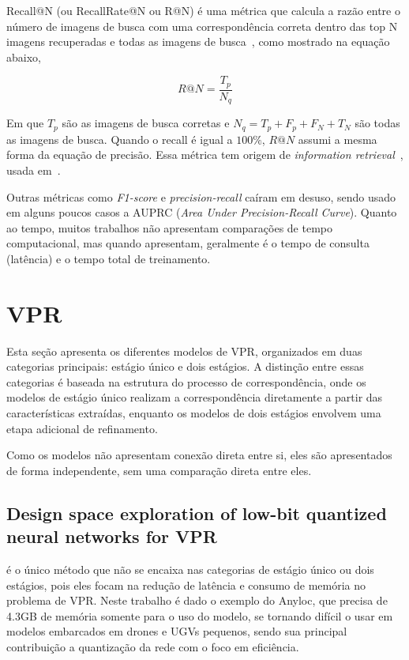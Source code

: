 \documentclass[letterpaper, 10 pt, conference]{ieeeconf}  %
\begin{document}
Recall@N (ou RecallRate@N ou R@N) é uma métrica que calcula a razão entre o número de imagens de busca com uma correspondência correta dentro das top N imagens recuperadas e todas as imagens de busca~\cite{vpr_bench, selavpr, ir1}, como mostrado na equação abaixo,

$$
R@N = \frac{T_p}{N_q}
$$

Em que $T_p$ são as imagens de busca corretas e $N_q = T_p + F_p + F_N + T_N$ são todas as imagens de busca. Quando o recall é igual a $100\%$, $R@N$ assumi a mesma forma da equação de precisão. Essa métrica tem origem de \textit{information retrieval}~\cite{if1}, usada em~\cite{ann1}.

Outras métricas como \textit{F1-score} e \textit{precision-recall} caíram em desuso, sendo usado em alguns poucos casos a AUPRC (\textit{Area Under Precision-Recall Curve}). Quanto ao tempo, muitos trabalhos não apresentam comparações de tempo computacional, mas quando apresentam, geralmente é o tempo de consulta (latência) e o tempo total de treinamento.


\section{VPR}

Esta seção apresenta os diferentes modelos de VPR, organizados em duas categorias principais: estágio único e dois estágios. A distinção entre essas categorias é baseada na estrutura do processo de correspondência, onde os modelos de estágio único realizam a correspondência diretamente a partir das características extraídas, enquanto os modelos de dois estágios envolvem uma etapa adicional de refinamento.

Como os modelos não apresentam conexão direta entre si, eles são apresentados de forma independente, sem uma comparação direta entre eles.

\subsection{Design space exploration of low-bit quantized neural networks for VPR}
\cite{low-bit} é o único método que não se encaixa nas categorias de estágio único ou dois estágios, pois eles focam na redução de latência e consumo de memória no problema de VPR. Neste trabalho é dado o exemplo do Anyloc, que precisa de 4.3GB de memória somente para o uso do modelo, se tornando difícil o usar em modelos embarcados em drones e UGVs pequenos, sendo sua principal contribuição a quantização da rede com o foco em eficiência.
\end{document}

